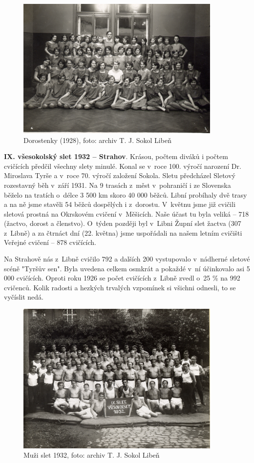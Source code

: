 \documentclass[a5paper, 11pt, twoside]{article}
\begin{document}
\begin{figure}[h!]
  \centering 
  \includegraphics[width=0.9\textwidth]{img/28_dorostenky.jpg}
  \caption*{Dorostenky (1928), foto: archiv T. J. Sokol Libeň}
\end{figure}

\textbf{IX. všesokolský slet 1932 -- Strahov}. Krásou, počtem diváků i počtem cvičících předčil všechny slety minulé.
Konal se v~roce 100. výročí narození Dr. Miroslava Tyrše a v~roce 70.
výročí založení Sokola. Sletu předcházel Sletový rozestavný běh v~září
1931. Na 9 trasách z~měst v~pohraničí i ze Slovenska běželo na tratích
o~délce 3 500 km skoro 40 000 běžců. Libní probíhaly dvě trasy a na ně
jsme stavěli 54 běžců dospělých i z~dorostu. V~květnu jsme již cvičili
sletová prostná na Okrskovém cvičení v~Měšicích. Naše účast tu byla
veliká -- 718 (žactvo, dorost a členstvo). O~týden později byl v~Libni
Župní slet žactva (307 z~Libně) a za čtrnáct dní (22. května) jsme
uspořádali na našem letním cvičišti Veřejné cvičení -- 878 cvičících.

Na Strahově nás z~Libně cvičilo 792 a dalších 200 vystupovalo v~nádherné
sletové scéně "Tyršův sen". Byla uvedena celkem osmkrát a pokaždé v~ní
účinkovalo asi 5 000 cvičících. Oproti roku 1926 se počet cvičících
z~Libně zvedl o~25 \% na 992 cvičenců. Kolik radosti a hezkých trvalých
vzpomínek si všichni odnesli, to se vyčíslit nedá.

\begin{figure}[h!]
  \centering 
  \includegraphics[width=0.9\textwidth]{img/29_muzi_slet.jpg}
  \caption*{Muži slet 1932, foto: archiv T. J. Sokol Libeň}
\end{figure}
\end{document}
